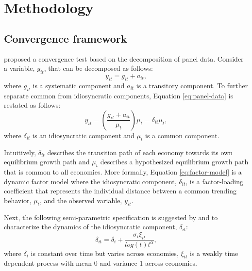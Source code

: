 \documentclass[11pt,a4paper,]{article}
\begin{document}
\hypertarget{methodology}{%
\section{Methodology}\label{methodology}}

\hypertarget{convergence-framework}{%
\subsection{Convergence framework}\label{convergence-framework}}

\textcite{phillips2007transition} proposed a convergence test based on the decomposition of panel data.
Consider a variable, \(y_{it}\), that can be decomposed as follows:
\begin{equation}
y_{it}=g_{it}+a_{it},
\label{eq:panel-data}
\end{equation}
where \(g_{it}\) is a systematic component and \(a_{it}\) is a transitory component.
To further separate common from idiosyncratic components, Equation \ref{eq:panel-data} is restated as follows:
\begin{equation}
y_{it}=\left(\frac{g_{it}+a_{it}}{\mu_{t}}\right)\mu_{t}=\delta_{it}\mu_{t},
\label{eq:factor-model}
\end{equation}
where \(\delta_{it}\) is an idiosyncratic component and \(\mu_{t}\) is a common component.

Intuitively, \(\delta_{it}\) describes the transition path of each economy towards its own equilibrium growth path and \(\mu_{t}\) describes a hypothesized equilibrium growth path that is common to all economies.
More formally, Equation \ref{eq:factor-model} is a dynamic factor model where the idiosyncratic component, \(\delta_{it}\), is a factor-loading coefficient that represents the individual distance between a common trending behavior, \(\mu_{t}\), and the observed variable, \(y_{it}\).

Next, the following semi-parametric specification is suggested by \textcite{phillips2007transition} and \textcite{phillips2009economic} to characterize the dynamics of the idiosyncratic component, \(\delta_{it}\):
\begin{equation}
\delta_{it}=\delta_{i}+\frac{\sigma_{i}\xi_{it}}{log\left(t\right)t^{\alpha}},
\label{eq:semiparametric}
\end{equation}
where \(\delta_{i}\) is constant over time but varies across economies, \(\xi_{it}\) is a weakly time dependent process with mean 0 and variance 1 across economies.
\end{document}
